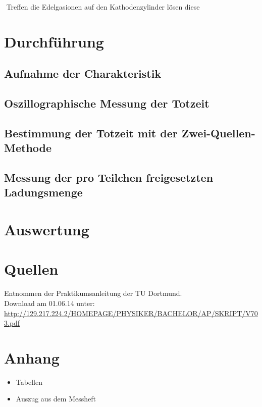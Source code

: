 \documentclass[11pt,ngerman,a4paper]{article}
\begin{document}
‭
Treffen die Edelgasionen auf den Kathodenzylinder l\"osen diese  
\section{Durchführung}
\subsection{Aufnahme der Charakteristik}
\subsection{Oszillographische Messung der Totzeit}
\subsection{Bestimmung der Totzeit mit der Zwei-Quellen-Methode}
\subsection{Messung der pro Teilchen freigesetzten Ladungsmenge}
\section{Auswertung}

\section{Quellen}
\begin{enumerate}[{[}1{]}]
\item Entnommen der Praktikumsanleitung \textit{} der TU Dortmund. \\
Download am 01.06.14 unter:\\
 \url{http://129.217.224.2/HOMEPAGE/PHYSIKER/BACHELOR/AP/SKRIPT/V703.pdf}
\end{enumerate}

\section{Anhang}
\begin{itemize}
\item Tabellen
\item Auszug aus dem Messheft
\end{itemize}
\end{document}
